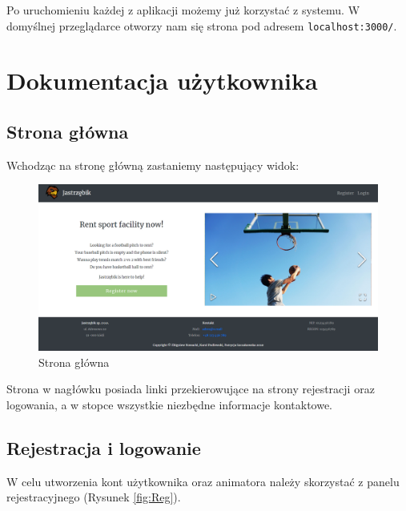 \documentclass[a4paper,11pt]{article}
\begin{document}
    Po uruchomieniu każdej z aplikacji możemy już korzystać z systemu. W domyślnej przeglądarce otworzy nam się strona pod adresem \verb|localhost:3000/|.


\newpage
\section{Dokumentacja użytkownika}

    \subsection{Strona główna}
    
    Wchodząc na stronę główną zastaniemy następujący widok:
    
    \begin{figure}[H] 
    	\begin{center}
    		\includegraphics[width=1\textwidth]{img3/Home.png}
            \caption{Strona główna}
    	\end{center}
    \end{figure}
        
    Strona w nagłówku posiada linki przekierowujące na strony rejestracji oraz logowania, a w stopce wszystkie niezbędne informacje kontaktowe. 

    \subsection{Rejestracja i logowanie}
    
    W celu utworzenia kont użytkownika oraz animatora należy skorzystać z panelu rejestracyjnego (Rysunek \ref{fig:Reg}).
    
\end{document}
